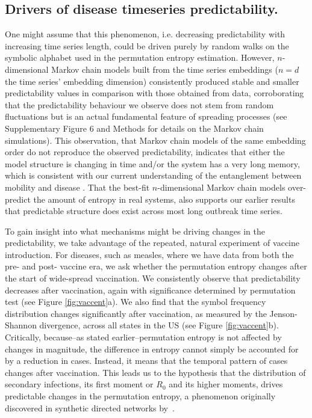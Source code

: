 \documentclass[fleqn,12pt]{wlscirep}
\begin{document}
\subsection*{Drivers of disease timeseries predictability.}
One might assume that this phenomenon, i.e. decreasing predictability with increasing time series length, could be driven purely by random walks on the symbolic alphabet used in the permutation entropy estimation. However, $n$-dimensional Markov chain models built from the time series embeddings ($n=d$ the time series' embedding dimension) consistently produced stable and smaller predictability values in comparison with those obtained from data, corroborating that the predictability behaviour we observe does not stem from random fluctuations but is an actual fundamental feature of spreading processes (see Supplementary Figure 6 and Methods for details on the Markov chain simulations).  This observation, that Markov chain models of the same embedding order do not reproduce the observed predictability, indicates that either the model structure is changing in time and\slash or the system has a very long memory, which is consistent with our current understanding of the entanglement between mobility and disease \cite{szell2011understanding,colizza2007predictability}.  That the best-fit $n$-dimensional Markov chain models over-predict the amount of entropy in real systems, also supports our earlier results that predictable structure does exist across most long outbreak time series. 
 
To gain insight into what mechanisms might be driving changes in the predictability, we take advantage of the repeated, natural experiment of vaccine introduction.  For diseases, such as measles, where we have data from both the pre- and post- vaccine era, we ask whether the permutation entropy changes after the start of wide-spread vaccination.  We consistently observe that predictability decreases after vaccination, again with significance determined by permutation test (see Figure \ref{fig:vaccent}a).  We also find that the symbol frequency distribution changes significantly after vaccination, as measured by the Jenson-Shannon divergence, across all states in the US (see Figure \ref{fig:vaccent}b). Critically, because--as stated earlier--permutation entropy is not affected by changes in magnitude, the difference in entropy cannot simply be accounted for by a reduction in cases.  Instead, it means that the temporal pattern of cases changes after vaccination.  This leads us to the hypothesis that the distribution of secondary infections, its first moment or $R_0$ and its higher moments, drives predictable changes in the permutation entropy, a phenomenon originally discovered in synthetic directed networks by~\citet{meyers2006predicting}.
\end{document}
